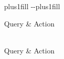 \documentclass[letterpaper,10pt,english]{sphinxmanual}
\begin{document}
\begin{savenotes}
\sphinxatlongtablestart
\sphinxthistablewithglobalstyle
\makeatletter
  \LTleft \@totalleftmargin plus1fill
  \LTright\dimexpr\columnwidth-\@totalleftmargin-\linewidth\relax plus1fill
\makeatother
\begin{longtable}{}
\sphinxtoprule
\sphinxstyletheadfamily 
\sphinxAtStartPar
Query
&\sphinxstyletheadfamily 
\sphinxAtStartPar
Action
\\
\sphinxmidrule
\endfirsthead

\\
\sphinxtoprule
\sphinxstyletheadfamily 
\sphinxAtStartPar
Query
&\sphinxstyletheadfamily 
\sphinxAtStartPar
Action
\\
\sphinxmidrule
\endhead

\sphinxbottomrule
{}\\
\endfoot

\endlastfoot
\sphinxtableatstartofbodyhook


\end{longtable}
\end{savenotes}
\end{document}
